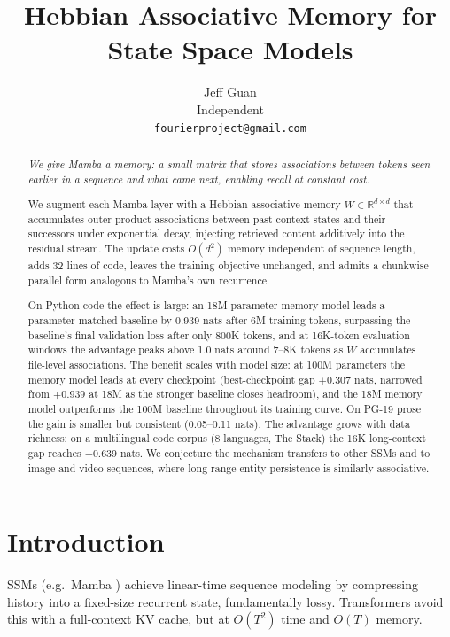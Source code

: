 \documentclass{article}
\title{Hebbian Associative Memory for State Space Models}
\author{
  Jeff Guan \\
  Independent \\
  \texttt{fourierproject@gmail.com}
}
\begin{document}
\maketitle

\begin{abstract}
\textit{We give Mamba a memory: a small matrix that stores associations between tokens seen earlier in a sequence and what came next, enabling recall at constant cost.}

We augment each Mamba layer with a Hebbian associative memory $W \in \mathbb{R}^{d \times d}$ that accumulates outer-product associations between past context states and their successors under exponential decay, injecting retrieved content additively into the residual stream. The update costs $O(d^2)$ memory independent of sequence length, adds 32 lines of code, leaves the training objective unchanged, and admits a chunkwise parallel form analogous to Mamba's own recurrence.

On Python code the effect is large: an 18M-parameter memory model leads a parameter-matched baseline by 0.939 nats after 6M training tokens, surpassing the baseline's final validation loss after only 800K tokens, and at 16K-token evaluation windows the advantage peaks above 1.0 nats around 7--8K tokens as $W$ accumulates file-level associations. The benefit scales with model size: at 100M parameters the memory model leads at every checkpoint (best-checkpoint gap $+$0.307 nats, narrowed from $+$0.939 at 18M as the stronger baseline closes headroom), and the 18M memory model outperforms the 100M baseline throughout its training curve. On PG-19 prose the gain is smaller but consistent (0.05--0.11 nats). The advantage grows with data richness: on a multilingual code corpus (8 languages, The Stack) the 16K long-context gap reaches $+$0.639 nats. We conjecture the mechanism transfers to other SSMs and to image and video sequences, where long-range entity persistence is similarly associative.
\end{abstract}

\section{Introduction}

SSMs (e.g.\ Mamba \citep{gu2023mamba}) achieve linear-time sequence modeling by compressing history into a fixed-size recurrent state, fundamentally lossy. Transformers avoid this with a full-context KV cache, but at $O(T^2)$ time and $O(T)$ memory.
\end{document}
